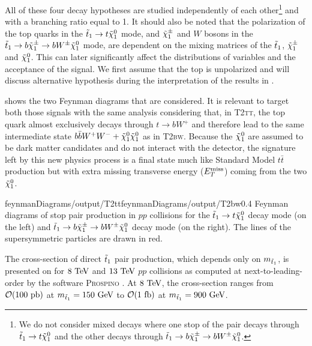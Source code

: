     All of these four decay hypotheses are studied independently
    of each other\footnote{We do not consider mixed decays where one stop of the pair
    decays through $\tilde{t}_1 \rightarrow t \tilde{\chi}_1^0$ and the other decays through
    $\tilde{t}_1 \rightarrow b \tilde{\chi}_1^\pm \rightarrow b W^{\pm} \tilde{\chi}_1^0$.} and with a
    branching ratio equal to 1. It should also be noted that the polarization of the
    top quarks in the $\tilde{t}_1 \rightarrow t \tilde{\chi}_1^0$ mode, and $\tilde{\chi}_1^\pm$ and
    $W$ bosons in the $\tilde{t}_1 \rightarrow b \tilde{\chi}_1^\pm \rightarrow b W^{\pm}
    \tilde{\chi}_1^0$ mode, are dependent on the mixing matrices of the $\tilde{t}_1$, $\tilde{\chi}_1^\pm$
    and $\tilde{\chi}_1^0$. This can later significantly affect the distributions of
    variables and the acceptance of the signal. We first assume that the top is unpolarized
    and will discuss alternative hypothesis during the interpretation of the results in
    .

     shows the two Feynman diagrams that are
    considered. It is relevant to target both those signals with the same analysis
    considering that, in \textsc{T2tt}, the top quark almost exclusively decays
    through $t \rightarrow b W^+$ and therefore lead to the same intermediate state
    $b \bar{b} W^+ W^- + \tilde{\chi}_1^0 \tilde{\chi}_1^0$ as in \textsc{T2bw}. Because the
    $\tilde{\chi}_1^0$ are assumed to be dark matter candidates and do not interact with
    the detector, the signature left by this new physics process is a final state much
    like Standard Model $t\bar{t}$ production but with extra missing transverse energy
    ($E_T^\text{miss}$) coming from the two $\tilde{\chi}_1^0$.

                     {feynmanDiagrams/output/T2tt}{feynmanDiagrams/output/T2bw}{0.4}
                     {Feynman diagrams of stop pair production in $pp$ collisions for the
                     $\tilde{t}_1 \rightarrow t \tilde{\chi}_1^0$ decay mode (on the left) and
                     $\tilde{t}_1 \rightarrow b \tilde{\chi}_1^\pm \rightarrow b W^{\pm} \tilde{\chi}_1^0$ decay mode
                     (on the right). The lines of the supersymmetric particles are drawn in red.}

    The cross-section of direct $\tilde{t}_1$ pair production, which depends only on $m_{\tilde{t}_1}$,
    is presented on  for $8~\text{TeV}$ and $13~\text{TeV}$ $pp$ collisions
    as computed at next-to-leading-order by the software \textsc{Prospino} \cite{Prospino, Prospino2}.
    At $8~\text{TeV}$, the cross-section ranges from $\mathcal{O}(100~\text{pb})$ at $m_{\tilde{t}_1} =
    150~\text{GeV}$ to $\mathcal{O}(1~\text{fb})$ at $m_{\tilde{t}_1} = 900 ~\text{GeV}$.

